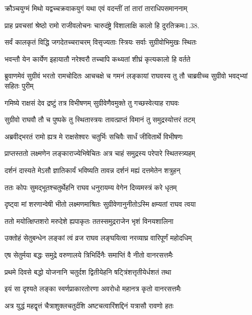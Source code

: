 \twolineshloka
{क्रौञ्चयुग्मं मिथो यद्वच्चक्रवाकयुगं यथा}
{एवं वदन्तीं तां तारां ताराधिपसमाननाम्}%

\twolineshloka
{प्राह प्रवचसां श्रेष्ठो रामो राजीवलोचनः}
{चारुदंष्ट्रे विशालाक्षि कालो हि दुरतिक्रमः1.38.}%

\twolineshloka
{सर्वं कालकृतं विद्धि जगदेतच्चराचरम्}
{विसृज्यताः स्त्रियः सर्वाः सुग्रीवोभिमुखः स्थितः}%


\twolineshloka
{भवन्तौ येन कार्येण इहायातौ नरेश्वरौ}
{तच्चापि कथ्यतां शीघ्रं कृत्यकालो हि वर्तते}%


\threelineshloka
{ब्रुवाणमेवं सुग्रीवं भरतो रामचोदितः}
{आचचक्षे च गमनं लङ्कायां राघवस्य तु}
{तौ चाब्रवीच्च सुग्रीवो भवद्भ्यां सहितः पुरीम्}%

\twolineshloka
{गमिष्ये राक्षसं देव द्रष्टुं तत्र विभीषणम्}
{सुग्रीवेणैवमुक्ते तु गच्छस्वेत्याह राघवः}%

\twolineshloka
{सुग्रीवो राघवौ तौ च पुष्पके तु स्थितास्त्रयः}
{तावत्प्राप्तं विमानं तु समुद्रस्योत्तरं तटम्}%

\twolineshloka
{अब्रवीद्भरतं रामो ह्यत्र मे राक्षसेश्वरः}
{चतुर्भिः सचिवैः सार्धं जीवितार्थे विभीषणः}%

\twolineshloka
{प्राप्तस्ततो लक्ष्मणेन लङ्काराज्येभिषेचितः}
{अत्र चाहं समुद्रस्य परेपारे स्थितस्त्र्यहम्}%

\twolineshloka
{दर्शनं दास्यते मेऽसौ ज्ञातिकार्यं भविष्यति}
{तावन्न दर्शनं मह्यं दत्तमेतेन शत्रुहन्}%

\twolineshloka
{ततः कोपः सुमद्भूतश्चतुर्थेहनि राघव}
{धनुरायम्य वेगेन दिव्यमस्त्रं करे धृतम्}%

\twolineshloka
{दृष्ट्वा मां शरणान्वेषी भीतो लक्ष्मणमाश्रितः}
{सुग्रीवेणानुनीतोऽस्मि क्षम्यतां राघव त्वया}%

\twolineshloka
{ततो मयोत्क्षिप्तशरो मरुदेशे ह्यपाकृतः}
{ततस्समुद्रराजेन भृशं विनयशालिना}%

\twolineshloka
{उक्तोहं सेतुबन्धेन लङ्कां त्वं व्रज राघव}
{लङ्घयित्वा नरव्याघ्र वारिपूर्णं महोदधिम्}%

\twolineshloka
{एष सेतुर्मया बद्धः समुद्रे वरुणालये}
{त्रिभिर्दिनैः समाप्तिं वै नीतो वानरसत्तमैः}%

\twolineshloka
{प्रथमे दिवसे बद्धो योजनानि चतुर्दश}
{द्वितीयेहनि षट्त्रिंशत्तृतीयेर्धशतं तथा}%

\twolineshloka
{इयं सा दृश्यते लङ्का स्वर्णप्राकारतोरणा}
{अवरोधो महानत्र कृतो वानरसत्तमैः}%

\twolineshloka
{अत्र युद्धं महद्वृत्तं चैत्राशुक्लचतुर्दशि}
{अष्टचत्वारिंशद्दिनं यत्रासौ रावणो हतः}%

